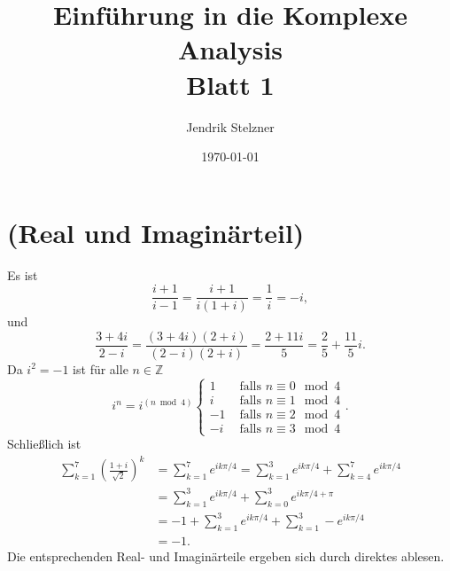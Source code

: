 \documentclass[a4paper,10pt]{article}
\title{\sc Einführung in die Komplexe Analysis \\ \Large Blatt 1}
\author{Jendrik Stelzner}
\date{\today}
\theoremstyle{definition}
\newcommand{\Z}{\mathbb{Z}}
\begin{document}
\maketitle





\section{(Real und Imaginärteil)}
Es ist
\[
 \frac{i+1}{i-1} = \frac{i+1}{i(1+i)} = \frac{1}{i} = -i,
\]
und
\[
 \frac{3+4i}{2-i} = \frac{(3+4i)(2+i)}{(2-i)(2+i)} = \frac{2+11i}{5} = \frac{2}{5} + \frac{11}{5}i.
\]
Da $i^2 = -1$ ist für alle $n \in \Z$
\[
 i^n =
 i^{(n \bmod 4)}
 \begin{cases}
   1 & \text{ falls } n \equiv 0 \mod 4 \\
   i & \text{ falls } n \equiv 1 \mod 4 \\
  -1 & \text{ falls } n \equiv 2 \mod 4 \\
  -i & \text{ falls } n \equiv 3 \mod 4
 \end{cases}.
\]
Schließlich ist
\begin{align*}
 \sum_{k=1}^7 \left(\frac{1+i}{\sqrt{2}}\right)^k
 &= \sum_{k=1}^7 e^{ik\pi/4}
 = \sum_{k=1}^3 e^{ik\pi/4} + \sum_{k=4}^7 e^{ik\pi/4} \\
 &= \sum_{k=1}^3 e^{ik\pi/4} + \sum_{k=0}^3 e^{ik\pi/4+\pi} \\
 &= -1 + \sum_{k=1}^3 e^{ik\pi/4} + \sum_{k=1}^3 -e^{ik\pi/4} \\
 &= -1.
\end{align*}
Die entsprechenden Real- und Imaginärteile ergeben sich durch direktes ablesen.
\end{document}
